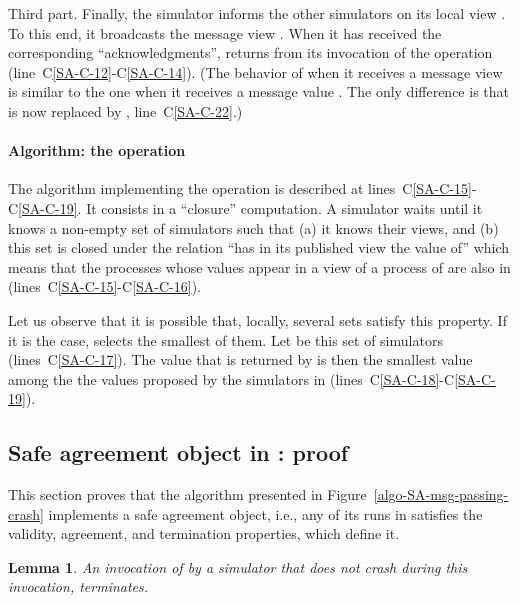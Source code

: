 \documentclass[11pt,letterpaper]{article}
\newtheorem{lemma}{Lemma}
\begin{document}
Third part. Finally, the simulator   informs the other simulators
on its local view . To this  end,  it broadcasts the message
{\sc view} . When it has received the corresponding
``acknowledgments'',  returns from its invocation of the operation
 (line~C\ref{SA-C-12}-C\ref{SA-C-14}).
(The behavior of   when it receives a message {\sc view} 
is similar to the one when it receives  a message {\sc value} .
The only difference is that  is now replaced by
, line~C\ref{SA-C-22}.)


\paragraph{Algorithm: the operation }
The algorithm implementing the operation  is described at
lines~C\ref{SA-C-15}-C\ref{SA-C-19}. It consists in a ``closure'' computation.
A simulator  waits until it knows a non-empty set of simulators
  such that (a) it knows their views, and (b) this set is closed
under the relation ``has in its published view the value of'' which means
that the processes whose values appear in a view of a process of 
are also in   (lines~C\ref{SA-C-15}-C\ref{SA-C-16}).

Let us observe that it is possible that, locally,  several sets satisfy this
property. If it is the case,  selects the smallest of them.
Let  be this set of simulators (lines~C\ref{SA-C-17}).
The  value that is returned by  is then the smallest
value among the the values proposed by the simulators in  
(lines~C\ref{SA-C-18}-C\ref{SA-C-19}).


\subsection{Safe agreement object in : proof}
This section proves that the algorithm presented in
Figure~\ref{algo-SA-msg-passing-crash} implements a safe agreement object,
i.e., any of its runs in    satisfies the validity, agreement,
and termination properties, which define it.


\begin{lemma}
\label{lemma:safe-agr-term-propose}
An invocation of   by a simulator that does not crash
during this  invocation,  terminates.
\end{lemma}
\end{document}
